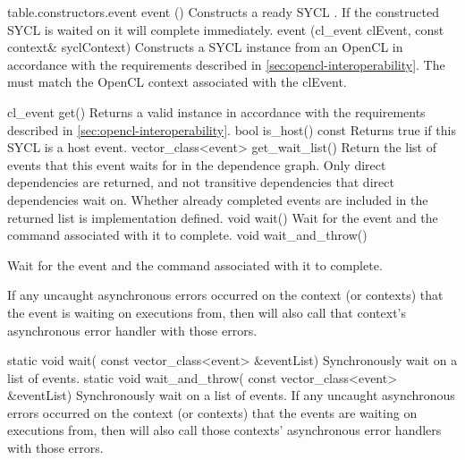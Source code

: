 

{table.constructors.event}
  \addRow
    {event ()}
    {  
      Constructs a ready SYCL . If the constructed SYCL  is waited on it will complete immediately.
    }
  \addRow
    {event (cl_event clEvent, const context\& syclContext)}
    {  
      Constructs a SYCL  instance from an OpenCL  in accordance with the requirements described in \ref{sec:opencl-interoperability}.    
      The  must match the OpenCL context associated
      with the clEvent.
    }
\completeTable

  \addRow
    {cl_event get()}
    {  
      Returns a valid  instance in accordance with the requirements described in \ref{sec:opencl-interoperability}.      
    }
  \addRow
    {bool is_host() const}
    {  
      Returns true if this SYCL  is a host event.     
    }
  \addRow
    {vector_class<event> get_wait_list()}
    {
      Return the list of events that this event waits for in
      the dependence graph.  Only direct dependencies are returned,
      and not transitive dependencies that direct dependencies wait on.
      Whether already completed events are included in the returned list
      is implementation defined.
    }
  \addRow
    {void wait()}
    {
      Wait for the event and the command associated with
      it to complete.
    }
  \addRow
    {void wait_and_throw()}
    {
      Wait for the event and the command associated with
      it to complete.

      If any uncaught asynchronous errors
      occurred on the context (or contexts) that the event
      is waiting on executions from, then will also call
      that context's asynchronous error handler with those
      errors.
    }
  \addRowTwoL
    {static void wait(}
    {  const vector_class<event> \&eventList)}
    {
      Synchronously wait on a list of events.
    }
  \addRowTwoL
    {static void wait_and_throw(}
    {const vector_class<event> \&eventList)}
    {
      Synchronously wait on a list of events.
      If any uncaught asynchronous errors occurred on
      the context (or contexts) that the events are waiting
      on executions from, then will also call those contexts'
      asynchronous error handlers with those errors.
    }

